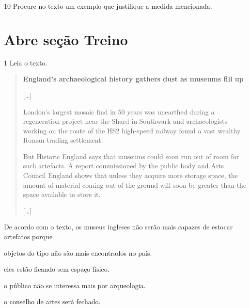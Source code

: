 
\num{10} Procure no texto um exemplo que justifique a medida mencionada.



\section{Abre seção Treino}

\num{1} Leia o texto.

\begin{quote}
\textbf{England's archaeological history gathers dust as museums fill up}

{[}\ldots{}{]}

London's largest mosaic find in 50 years was unearthed during a
regeneration project near the Shard in Southwark and archaeologists
working on the route of the HS2 high-speed railway found a vast wealthy
Roman trading settlement.

But Historic England says that museums could soon run out of room for
such artefacts. A report commissioned by the public body and Arts
Council England shows that unless they acquire more storage space, the
amount of material coming out of the ground will soon be greater than
the space available to store it.

{[}\ldots{}{]}

\end{quote}

De acordo com o texto, os museus ingleses não serão mais capazes de
estocar artefatos porque

\begin{escolha}
\item objetos do tipo não são mais encontrados no país.

\item eles estão ficando sem espaço físico.

\item o público não se interessa mais por arqueologia.

\item o conselho de artes será fechado.
\end{escolha}


